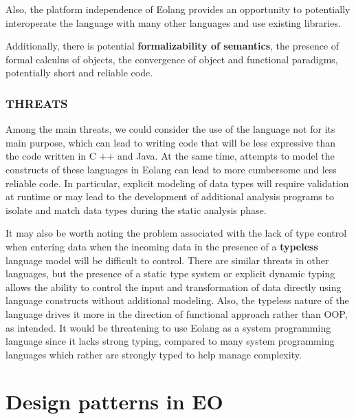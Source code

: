 \documentclass[12pt]{book}
\begin{document}
Also, the platform independence of Eolang provides an opportunity to potentially interoperate the language with many other languages and use existing libraries.

Additionally, there is potential \textbf{formalizability of semantics}, the presence of formal calculus of objects, the convergence of object and functional paradigms, potentially short and reliable code.

\subsection{THREATS}
Among the main threats, we could consider the use of the language not for its main purpose, which can lead to writing code that will be less expressive than the code written in C ++ and Java. At the same time, attempts to model the constructs of these languages in Eolang can lead to more cumbersome and less reliable code. In particular, explicit modeling of data types will require validation at runtime or may lead to the development of additional analysis programs to isolate and match data types during the static analysis phase.

It may also be worth noting the problem associated with the lack of type control when entering data when the incoming data in the presence of a \textbf{typeless} language model will be difficult to control. There are similar threats in other languages, but the presence of a static type system or explicit dynamic typing allows the ability to control the input and transformation of data directly using language constructs without additional modeling. Also, the typeless nature of the language drives it more in the direction of functional approach rather than OOP, as intended. It would be threatening to use Eolang as a system programming language since it lacks strong typing, compared to many system programming languages which rather are strongly typed to help manage complexity.

\chapter{Design patterns in EO}
\end{document}
